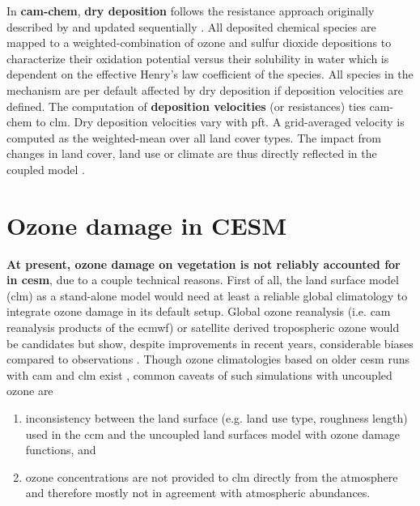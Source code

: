 In \textbf{\gls{cam}-chem}, \textbf{dry deposition} follows the resistance approach originally described by \textcites{AE:Wesely1989}{AE:Walcek1986} and updated sequentially \parencites{AE:Walmsley1996}{AE:Wesely2000}. All deposited chemical species are mapped to a weighted-combination of ozone and sulfur dioxide depositions to characterize their oxidation potential versus their solubility in water which is dependent on the effective Henry’s law coefficient of the species. All species in the mechanism are per default affected by dry deposition if deposition velocities are defined. The computation of \textbf{deposition velocities} (or resistances) ties \gls{cam}-chem to \gls{clm}. Dry deposition velocities vary with \gls{pft}. A grid-averaged velocity is computed as the weighted-mean over all land cover types. The impact from changes in land cover, land use or climate are thus directly reflected in the coupled model \parencite{GMD:Lamarque2012}. 

\section{Ozone damage in CESM}
\label{sec:ozone_damage}
\textbf{At present, ozone damage on vegetation is not reliably accounted for in \gls{cesm}}, due to a couple technical reasons. First of all, the land surface model (\gls{clm}) as a stand-alone model would need at least a reliable global climatology to integrate ozone damage in its default setup. Global ozone reanalysis (i.e. \gls{cam} reanalysis products of the \gls{ecmwf}) or satellite derived tropospheric ozone would be candidates but show, despite improvements in recent years, considerable biases compared to observations \parencites{GMD:Huijnen2020}{ACPD:Barten2020}. Though ozone climatologies based on older \gls{cesm} runs with \gls{cam} and \gls{clm} exist \parencite{ACP:Lamarque2010}, common caveats of such simulations with uncoupled ozone are
\begin{enumerate}
\itemsep0pt
\item inconsistency between the land surface (e.g. land use type, roughness length) used in the \gls{ccm} and the uncoupled land surfaces model with ozone damage functions, and
\item ozone concentrations are not provided to \gls{clm} directly from the atmosphere and therefore mostly not in agreement with atmospheric abundances.
\end{enumerate}

